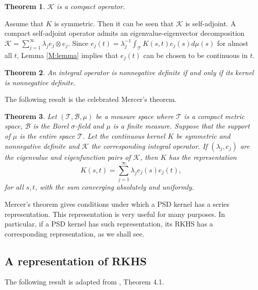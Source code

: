 \documentclass[11pt]{article}
\theoremstyle{plain}
\newtheorem{theorem}{\quad\quad Theorem}
\theoremstyle{definition}
\theoremstyle{remark}
\begin{document}
\begin{theorem}
    $\mathcal K$ is a compact operator.
\end{theorem}
Assume that $K$ is symmetric.
Then it can be seen that $\mathcal K$ is self-adjoint.
A compact self-adjoint operator admits an eigenvalue-eigenvector decomposition $\mathcal K= \sum_{j=1}^\infty \lambda_j e_j \otimes e_j$.
Since $e_j(t)=\lambda_j^{-1} \int_{\mathcal T} K(s,t) e_j(s) d\mu(s)$ for almost all $t$, Lemma \ref{M:lemma} implies that $e_j(t)$ can be chosen to be continuous in $t$.

\begin{theorem}
    An integral operator is nonnegative definite if and only if its kernel is nonnegative definite.
\end{theorem}

The following result is the celebrated Mercer's theorem.
\begin{theorem}

Let $(\mathcal T, \mathcal B, \mu)$ be a measure space where $\mathcal T$ is a compact metric space, $\mathcal B$ is the Borel $\sigma$-field and $\mu$ is a finite measure.
Suppose that the support of $\mu$ is the entire space $\mathcal T$.
    Let the continuous kernel $K$ be symmetric and nonnegative definite and $\mathcal K$ the corresponding integral operator.
    If $(\lambda_j, e_j)$ are the eigenvalue and eigenfunction pairs of $\mathcal K$, then $K$ has the representation
    \begin{equation*}
        K(s,t)=\sum_{j=1}^\infty \lambda_j e_j(s) e_j(t), 
    \end{equation*}
    for all $s,t$, with the sum converging absolutely and uniformly.
\end{theorem}

Mercer's theorem gives conditions under which a PSD kernel has a series representation.
This representation is very useful for many purposes.
In particular, if a PSD kernel has such representation, its RKHS has a corresponding representation, as we shall see.

\subsection{A representation of RKHS}
The following result is adapted from \cite{vandervaart}, Theorem 4.1.
\end{document}
